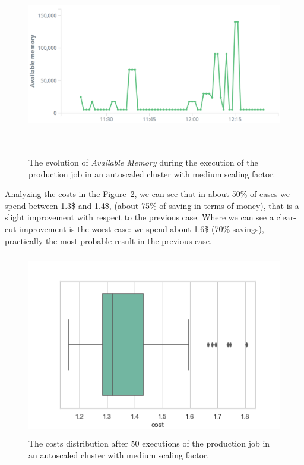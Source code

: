 \documentclass[12pt,twoside,cucitura]{toptesi}
\begin{document}
\begin{figure}
\centering
\includegraphics[height=80mm]{medium-a-memory}
\caption{The evolution of \textit{Available Memory} during the execution of the production job in an autoscaled cluster with medium scaling factor.}\label{fig:medium-a-memory}
\end{figure}

Analyzing the costs in the Figure~\ref{fig:medium-cost}, we can see that in about 50\% of cases we spend between 1.3\$ and 1.4\$, (about 75\% of saving in terms of money), that is a slight improvement with respect to the previous case. Where we can see a clear-cut improvement is the worst case: we spend about 1.6\$ (70\% savings), practically the most probable result in the previous case. 

\begin{figure}
\centering
\includegraphics[height=80mm]{medium-cost}
\caption{The costs distribution after 50 executions of the production job in an autoscaled cluster with medium scaling factor.}\label{fig:medium-cost}
\end{figure}
\end{document}
